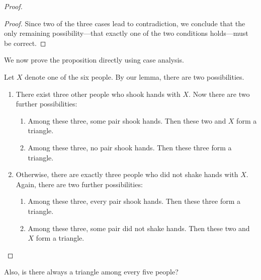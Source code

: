 \documentclass[twoside,12pt]{article}
\begin{document}
\begin{problem}{12}
{\begin{proof}
\begin{proof}
Since two of the three cases lead to contradiction, we conclude that the only remaining possibility---that exactly one of the two conditions holds---must be correct.
\end{proof}

We now prove the proposition directly using case analysis. 

Let $X$ denote one of the six people. By our lemma, there
are two possibilities.
%
\begin{enumerate}
\item There exist three other people who shook hands with $X$.  Now
there are two further possibilities:
%
\begin{enumerate}
\item Among these three, some pair shook hands.  Then these two and
$X$ form a triangle.
\item Among these three, no pair shook hands.  Then these three form a
triangle.
\end{enumerate}
%
\item Otherwise, there are exactly three people who did not shake hands with $X$.
Again, there are two further possibilities:
%
\begin{enumerate}
\item Among these three, every pair shook hands.  Then these three
form a triangle.
\item Among these three, some pair did not shake hands.  Then these two
and $X$ form a triangle.
\end{enumerate}
\end{enumerate}
\end{proof}
}

Also, is there always a triangle among every five people?

\eparts

\end{problem}

\end{document}
